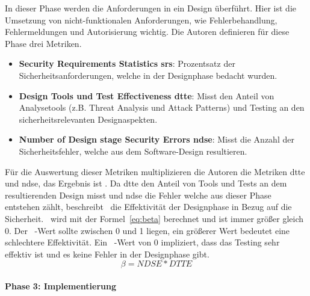 \documentclass[12pt, a4paper, ngerman]{article}
\begin{document}
In dieser Phase werden die Anforderungen in ein Design überführt. 
Hier ist die Umsetzung von nicht-funktionalen Anforderungen, wie Fehlerbehandlung, Fehlermeldungen und Autorisierung wichtig.
Die Autoren definieren für diese Phase drei Metriken.
\begin{itemize}
  \item \textbf{Security Requirements Statistics \acs{srs}}: Prozentsatz der Sicherheitsanforderungen, welche in der Designphase bedacht wurden.
  \item \textbf{Design Tools und Test Effectiveness \acs{dtte}}: Misst den Anteil von Analysetools (z.B. Threat Analysis und Attack Patterns) und Testing an den sicherheitsrelevanten Designaspekten. 
  \item \textbf{Number of Design stage Security Errors \acs{ndse}}: Misst die Anzahl der Sicherheitsfehler, welche aus dem Software-Design resultieren. 
\end{itemize}
Für die Auswertung dieser Metriken multiplizieren die Autoren die Metriken \ac{dtte} und \ac{ndse}, das Ergebnis ist \beta. 
Da \ac{dtte} den Anteil von Tools und Tests an dem resultierenden Design misst und \ac{ndse} die Fehler welche aus dieser Phase entstehen zählt, 
beschreibt \beta~die Effektivität der Designphase in Bezug auf die Sicherheit.
\beta~wird mit der Formel~\ref{eq:beta} berechnet und ist immer größer gleich 0. 
Der \beta~-Wert sollte zwischen 0 und 1 liegen, ein größerer Wert bedeutet eine schlechtere Effektivität.
Ein \beta~-Wert von 0 impliziert, dass das Testing sehr effektiv ist und es keine Fehler in der Designphase gibt.
\begin{equation} \label{eq:beta}
  \beta = NDSE * DTTE
\end{equation}

\paragraph{Phase 3: Implementierung}
\end{document}
